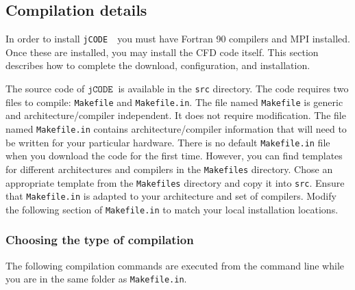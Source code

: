 \documentclass[12pt]{article}
\newcommand{\code}[1]{\texttt{#1}}
\newcommand{\jcode}{\code{jCODE}~}
\begin{document}
\newpage

\subsection{Compilation details \label{sec:compile}}
In order to install \jcode\ you must have Fortran 90 compilers and MPI installed. Once these are installed, you may install the CFD code itself. This section describes how to complete the download, configuration, and installation.

The source code of $\jcode$ is available in the \code{src} directory. The code requires two files to compile: \code{Makefile} and \code{Makefile.in}.
The file named \code{Makefile} is generic and architecture/compiler independent. It does not require modification. The file named \code{Makefile.in} contains architecture/compiler information that will need to be written for your particular hardware. There is no default \code{Makefile.in} file when you download the code for the first time. However, you can find templates for different architectures and compilers in the \code{Makefiles} directory. 
Chose an appropriate template from the \code{Makefiles} directory and copy it into \code{src}.
Ensure that \code{Makefile.in} is adapted to your architecture and set of compilers. Modify the following section of \code{Makefile.in} to match your local installation locations. 

\vspace{1em}
\vspace{1em} 

\subsubsection*{Choosing the type of compilation}
The following compilation commands are executed from the command line while you are in the same folder as \code{Makefile.in}. \\
\end{document}
